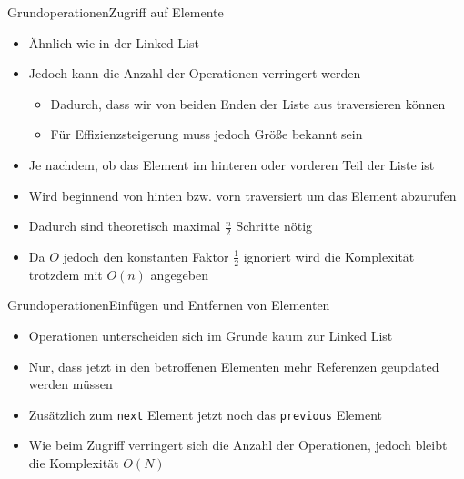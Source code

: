 \begin{frame}{Grundoperationen}{Zugriff auf Elemente}
	\begin{itemize}
		\item Ähnlich wie in der Linked List
		\item Jedoch kann die Anzahl der Operationen verringert werden
		\begin{itemize}
			\item Dadurch, dass wir von beiden Enden der Liste aus traversieren können
			\item Für Effizienzsteigerung muss jedoch Größe bekannt sein
		\end{itemize}
		\item Je nachdem, ob das Element im hinteren oder vorderen Teil der Liste ist
		\item Wird beginnend von hinten bzw. vorn traversiert um das Element abzurufen
		\item Dadurch sind theoretisch maximal $\frac{n}{2}$ Schritte nötig
		\item Da $O$ jedoch den konstanten Faktor $\frac{1}{2}$ ignoriert wird die Komplexität trotzdem mit $O(n)$ angegeben
	\end{itemize}
\end{frame}

\begin{frame}{Grundoperationen}{Einfügen und Entfernen von Elementen}
	\begin{itemize}
		\item Operationen unterscheiden sich im Grunde kaum zur Linked List
		\item Nur, dass jetzt in den betroffenen Elementen mehr Referenzen geupdated werden müssen
		\item Zusätzlich zum \texttt{next} Element jetzt noch das \texttt{previous} Element
		\item Wie beim Zugriff verringert sich die Anzahl der Operationen, jedoch bleibt die Komplexität $O(N)$
	\end{itemize}
\end{frame}


